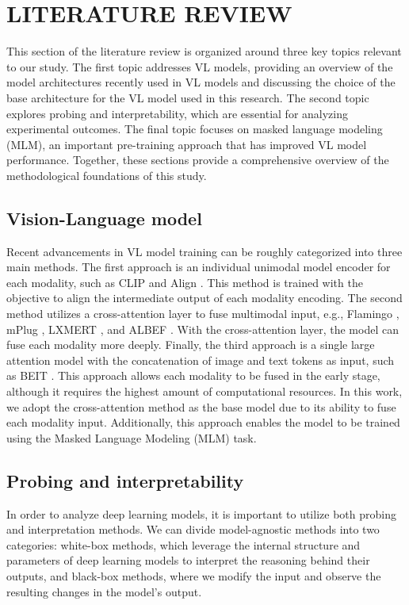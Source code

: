 \chapter{LITERATURE REVIEW}
This section of the literature review is organized around three key topics relevant to our study.
The first topic addresses VL models, providing an overview of the model architectures recently used in VL models and discussing the choice of the base architecture for the VL model used in this research.
The second topic explores probing and interpretability, which are essential for analyzing experimental outcomes.
The final topic focuses on masked language modeling (MLM), an important pre-training approach that has improved VL model performance.
Together, these sections provide a comprehensive overview of the methodological foundations of this study.

\section{Vision-Language model}
Recent advancements in VL model training can be roughly categorized into three main methods. 
The first approach is an individual unimodal model encoder for each modality, such as CLIP \cite{clip} and Align \cite{align}.
This method is trained with the objective to align the intermediate output of each modality encoding. 
The second method utilizes a cross-attention layer to fuse multimodal input, e.g., Flamingo \cite{flamingo}, mPlug \cite{mplug}, LXMERT \cite{lxmert}, and ALBEF \cite{albef}. 
With the cross-attention layer, the model can fuse each modality more deeply. 
Finally, the third approach is a single large attention model with the concatenation of image and text tokens as input, such as BEIT \cite{beit-3}. 
This approach allows each modality to be fused in the early stage, although it requires the highest amount of computational resources.
In this work, we adopt the cross-attention method as the base model due to its ability to fuse each modality input.
Additionally, this approach enables the model to be trained using the Masked Language Modeling (MLM) task.


\section{Probing and interpretability}
In order to analyze deep learning models, it is important to utilize both probing and interpretation methods. 
We can divide model-agnostic methods into two categories: white-box methods, which leverage the internal structure and parameters of deep learning models to interpret the reasoning behind their outputs, and black-box methods, where we modify the input and observe the resulting changes in the model's output.

